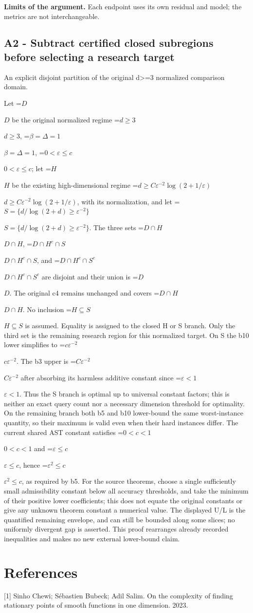 \documentclass[10pt,a4paper]{article}
\newcommand{\AtlasMath}[1]{\par\begingroup\centering\setbox0=\hbox{$\displaystyle #1$}\ifdim\wd0>1.4\linewidth\typeout{ATLAS WIDE FORMULA: \the\wd0}\fi\ifdim\wd0>\linewidth\resizebox{\linewidth}{!}{\box0}\else\box0\fi\par\endgroup}
\newcommand{\AtlasInlineMath}[1]{\begingroup\setbox0=\hbox{$#1$}\ifdim\wd0>.4\linewidth\endgroup\AtlasMath{#1}\else\endgroup$#1$\fi}
\begin{document}
\textbf{Limits of the argument.} Each endpoint uses its own residual and model; the metrics are not interchangeable.

\subsection{A2 - Subtract certified closed subregions before selecting a research target}
An explicit disjoint partition of the original d>=3 normalized comparison domain.

Let \AtlasInlineMath{D} be the original normalized regime \AtlasInlineMath{d\ge3}, \AtlasInlineMath{\beta=\Delta=1}, \AtlasInlineMath{0<\varepsilon\le c}; let \AtlasInlineMath{H} be the existing high-dimensional regime \AtlasInlineMath{d\ge C\varepsilon^{-2}\log(2+1/\varepsilon)}, with its normalization, and let \AtlasInlineMath{S=\{d/\log(2+d)\ge\varepsilon^{-2}\}}. The three sets \AtlasInlineMath{D\cap H}, \AtlasInlineMath{D\cap H^c\cap S}, and \AtlasInlineMath{D\cap H^c\cap S^c} are disjoint and their union is \AtlasInlineMath{D}. The original c4 remains unchanged and covers \AtlasInlineMath{D\cap H}. No inclusion \AtlasInlineMath{H\subseteq S} is assumed. Equality is assigned to the closed H or S branch. Only the third set is the remaining research region for this normalized target. On S the b10 lower simplifies to \AtlasInlineMath{c\varepsilon^{-2}}. The b3 upper is \AtlasInlineMath{C\varepsilon^{-2}} after absorbing its harmless additive constant since \AtlasInlineMath{\varepsilon<1}. Thus the S branch is optimal up to universal constant factors; this is neither an exact query count nor a necessary dimension threshold for optimality. On the remaining branch both b5 and b10 lower-bound the same worst-instance quantity, so their maximum is valid even when their hard instances differ. The current shared AST constant satisfies \AtlasInlineMath{0<c<1} and \AtlasInlineMath{\varepsilon\le c}, hence \AtlasInlineMath{\varepsilon^2\le c}, as required by b5. For the source theorems, choose a single sufficiently small admissibility constant below all accuracy thresholds, and take the minimum of their positive lower coefficients; this does not equate the original constants or give any unknown theorem constant a numerical value. The displayed U/L is the quantified remaining envelope, and can still be bounded along some slices; no uniformly divergent gap is asserted. This proof rearranges already recorded inequalities and makes no new external lower-bound claim.

\section{References}
[1] Sinho Chewi; Sébastien Bubeck; Adil Salim. On the complexity of finding stationary points of smooth functions in one dimension. 2023.
\end{document}
